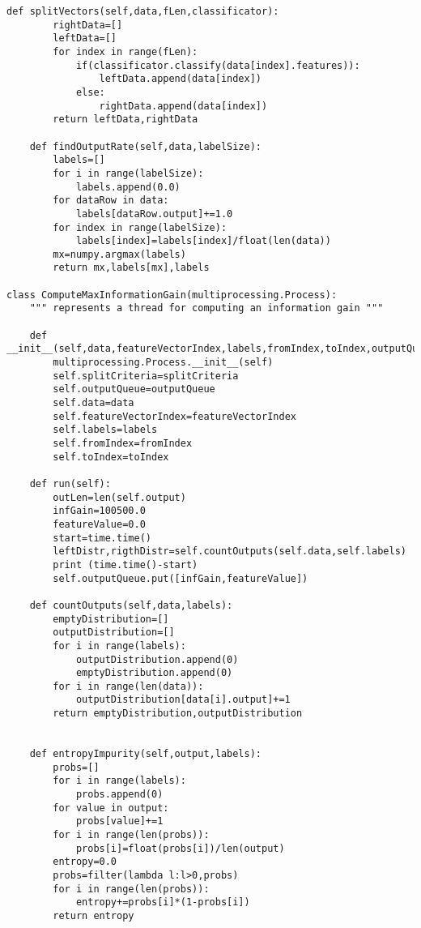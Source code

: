 \begin{lstlisting}[style=python,caption=Classification tree]
    def splitVectors(self,data,fLen,classificator):
        rightData=[]
        leftData=[]        
        for index in range(fLen):
            if(classificator.classify(data[index].features)):
                leftData.append(data[index])
            else:
                rightData.append(data[index])
        return leftData,rightData
        
    def findOutputRate(self,data,labelSize):
        labels=[]
        for i in range(labelSize):
            labels.append(0.0)
        for dataRow in data:
            labels[dataRow.output]+=1.0
        for index in range(labelSize):
            labels[index]=labels[index]/float(len(data))
        mx=numpy.argmax(labels)
        return mx,labels[mx],labels

class ComputeMaxInformationGain(multiprocessing.Process):
	""" represents a thread for computing an information gain """

    def __init__(self,data,featureVectorIndex,labels,fromIndex,toIndex,outputQueue,splitCriteria):
        multiprocessing.Process.__init__(self)
        self.splitCriteria=splitCriteria
        self.outputQueue=outputQueue
        self.data=data
        self.featureVectorIndex=featureVectorIndex
        self.labels=labels
        self.fromIndex=fromIndex
        self.toIndex=toIndex
        
    def run(self):
        outLen=len(self.output)
        infGain=100500.0
        featureValue=0.0
        start=time.time()
        leftDistr,rigthDistr=self.countOutputs(self.data,self.labels)
        print (time.time()-start)
        self.outputQueue.put([infGain,featureValue])
        
    def countOutputs(self,data,labels):        
        emptyDistribution=[]        
        outputDistribution=[]
        for i in range(labels):
            outputDistribution.append(0)
            emptyDistribution.append(0)
        for i in range(len(data)):
            outputDistribution[data[i].output]+=1
        return emptyDistribution,outputDistribution
        
        
    def entropyImpurity(self,output,labels):
        probs=[]
        for i in range(labels):
            probs.append(0)
        for value in output:
            probs[value]+=1
        for i in range(len(probs)):
            probs[i]=float(probs[i])/len(output)
        entropy=0.0
        probs=filter(lambda l:l>0,probs)
        for i in range(len(probs)):
            entropy+=probs[i]*(1-probs[i])
        return entropy

\end{lstlisting}
